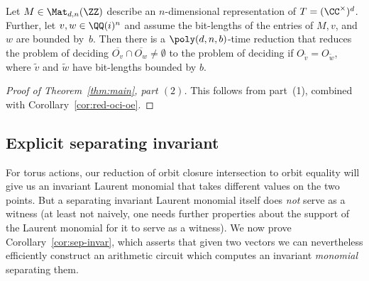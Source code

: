 \begin{corollary} \label{cor:red-oci-oe}
Let $M \in \Mat_{d,n}(\ZZ)$ describe an $n$-dimensional representation of $T = (\CC^\times)^d$.
Further, let $v,w \in \QQ(i)^n$ and assume the bit-lengths of the entries of $M,v$, and $w$ are bounded by~$b$.
Then there is a $\poly(d,n,b)$-time reduction that reduces the problem of deciding $\overline{O_v} \cap \overline{O_w} \ne \emptyset$
to the problem of deciding if $O_{\widetilde{v}} = O_{\widetilde{w}}$, where $\widetilde{v}$ and $\widetilde{w}$ have bit-lengths bounded by $b$.
\end{corollary}

\begin{proof}[Proof of Theorem~\ref{thm:main}, part $(2)$]
This follows from part~(1), combined with Corollary~\ref{cor:red-oci-oe}.
\end{proof}

%
\subsection{Explicit separating invariant}
%
For torus actions, our reduction of orbit closure intersection to orbit equality will give us an invariant Laurent monomial that takes different values on the two points.
But a separating invariant Laurent monomial itself does \emph{not} serve as a witness (at least not naively, one needs further properties about the support of the Laurent monomial for it to serve as a witness).
We now prove Corollary~\ref{cor:sep-invar}, which asserts that given two vectors we can nevertheless efficiently construct an arithmetic circuit which computes an invariant \emph{monomial} separating them.

